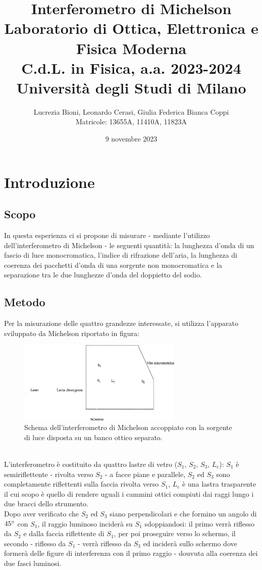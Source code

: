 \documentclass[]{article}
\title{%
    \Huge Interferometro di Michelson \\
    \Large Laboratorio di Ottica, Elettronica e Fisica Moderna \\ C.d.L. in Fisica, a.a. 2023-2024 \\ Università degli Studi di Milano}
\author{\LARGE Lucrezia Bioni, Leonardo Cerasi, Giulia Federica Bianca Coppi \\ Matricole: 13655A, 11410A, 11823A}
\date{9 novembre 2023}
\let\oldsection\section%
\renewcommand{\section}{%
	\renewcommand{\theequation}{\thesection.\arabic{equation}}%
	\oldsection}%
\let\oldsubsection\subsection%
\renewcommand{\subsection}{%
	\renewcommand{\theequation}{\thesubsection.\arabic{equation}}%
	\oldsubsection}%
\begin{document}
\maketitle

\section{Introduzione}

\subsection{Scopo}

In questa esperienza ci si propone di misurare - mediante l'utilizzo dell'interferometro di Michelson - le seguenti quantità: la lunghezza d'onda di un fascio di luce monocromatica, l'indice di rifrazione dell'aria, la lunghezza di coerenza dei pacchetti d'onda di una sorgente non monocromatica e la separazione tra le due lunghezze d'onda del doppietto del sodio.
\subsection{Metodo}

Per la misurazione delle quattro grandezze interessate, si utilizza l'apparato sviluppato da Michelson riportato in figura:
\begin{figure}[!h]
    \centering
    \includegraphics[width=0.70\textwidth]{disegnetto-michelson.png}
    \caption{Schema dell'interferometro di Michelson accoppiato con la sorgente di luce disposta su un banco ottico separato.}
    \label{schema}
\end{figure}\\
L'interferometro è costituito da quattro lastre di vetro ($S_1, \, S_2, \, S_3, \, L_c$): $S_1$ è semiriflettente - rivolta verso $S_2$ - a facce piane e parallele, $S_2$ ed $S_3$ sono completamente riflettenti sulla faccia rivolta verso $S_1$, $L_c$ è una lastra trasparente il cui scopo è quello di rendere uguali i cammini ottici compiuti dai raggi lungo i due bracci dello strumento. \\ Dopo aver verificato che $S_2$ ed $S_3$ siano perpendicolari e che formino un angolo di $45\degree$ con $S_1$, il raggio luminoso inciderà su $S_1$ sdoppiandosi: il primo verrà riflesso da $S_2$ e dalla faccia riflettente di $S_1$, per poi proseguire verso lo schermo, il secondo - riflesso da $S_1$ - verrà riflesso da $S_3$ ed inciderà sullo schermo dove formerà delle figure di interferenza con il primo raggio - douvuta alla coerenza dei due fasci luminosi.
\end{document}
